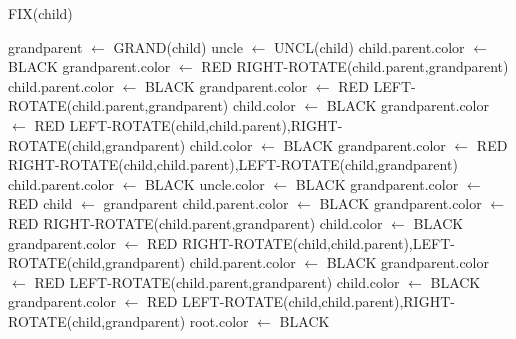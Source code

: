 \documentclass{article}
\begin{document}
\begin{algorithm}
\caption{FIX(child)}
\begin{algorithmic}
{
	{
		\STATE grandparent {$\leftarrow$} GRAND(child)
		\STATE uncle {$\leftarrow$} UNCL(child)
		{
			{
				\STATE child.parent.color {$\leftarrow$} BLACK
				\STATE grandparent.color {$\leftarrow$} RED
				\STATE RIGHT-ROTATE(child.parent,grandparent)
			}
			{
				\STATE child.parent.color {$\leftarrow$} BLACK
				\STATE grandparent.color {$\leftarrow$} RED
				\STATE LEFT-ROTATE(child.parent,grandparent)
			}
				{
					\STATE child.color {$\leftarrow$} BLACK
					\STATE grandparent.color {$\leftarrow$} RED
					\STATE LEFT-ROTATE(child,child.parent),RIGHT-ROTATE(child,grandparent)
				}
				\ELSE  
					{
						\STATE child.color {$\leftarrow$} BLACK
						\STATE grandparent.color {$\leftarrow$} RED
						\STATE RIGHT-ROTATE(child,child.parent),LEFT-ROTATE(child,grandparent)
					}
			\ENDIF
		}
		{
			\STATE child.parent.color {$\leftarrow$} BLACK
			\STATE uncle.color {$\leftarrow$} BLACK
			\STATE grandparent.color {$\leftarrow$} RED
			\STATE child {$\leftarrow$} grandparent
		}
			\ELSE 
			{
				{
					\STATE child.parent.color {$\leftarrow$} BLACK
					\STATE grandparent.color {$\leftarrow$} RED
					\STATE RIGHT-ROTATE(child.parent,grandparent)
				}
					{
						\STATE child.color {$\leftarrow$} BLACK
						\STATE grandparent.color {$\leftarrow$} RED
						\STATE RIGHT-ROTATE(child,child.parent),LEFT-ROTATE(child,grandparent)
					}
						{
							\STATE child.parent.color {$\leftarrow$} BLACK
							\STATE grandparent.color {$\leftarrow$} RED
							\STATE LEFT-ROTATE(child.parent,grandparent)
						}
						\ELSE
						{
							\STATE child.color {$\leftarrow$} BLACK
 							\STATE grandparent.color {$\leftarrow$} RED
							\STATE LEFT-ROTATE(child,child.parent),RIGHT-ROTATE(child,grandparent)
						}
				\ENDIF
			}
		\ENDIF
	}
	\ENDWHILE
	\STATE root.color {$\leftarrow$} BLACK
}
\end{algorithmic}
\end{algorithm}
\newpage
\end{document}
